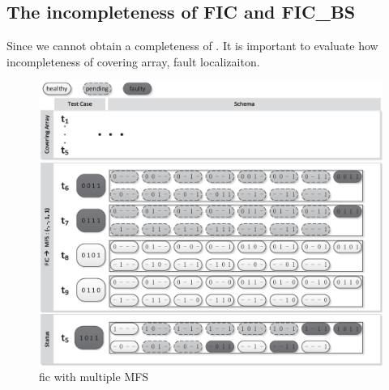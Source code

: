 \subsection{The incompleteness of FIC and FIC\_BS}


Since we cannot obtain a completeness of . It is important to evaluate how incompleteness of covering array, fault localizaiton.

\begin{figure}[!htb]
 \centering
 \includegraphics[width=5.3in]{fic.eps}
 \caption{fic with multiple MFS}
 \label{fig_fic_multi}
\end{figure}


